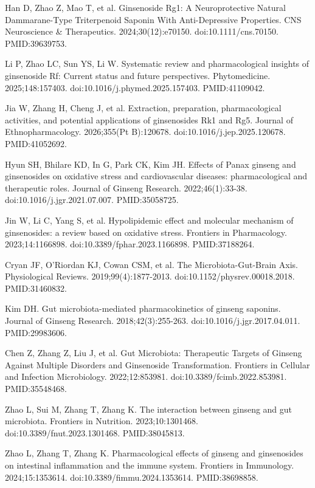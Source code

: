 \documentclass[12pt,oneside]{book}
\newcommand{\reff}[2]{\par\hangindent=7mm\hangafter=1\noindent[#1]\hspace{2mm}#2\par}
\begin{document}
\reff{15}{Han D, Zhao Z, Mao T, et al. Ginsenoside Rg1: A Neuroprotective Natural Dammarane-Type Triterpenoid Saponin With Anti-Depressive Properties. CNS Neuroscience \& Therapeutics. 2024;30(12):e70150. doi:10.1111/cns.70150. PMID:39639753.}

\reff{16}{Li P, Zhao LC, Sun YS, Li W. Systematic review and pharmacological insights of ginsenoside Rf: Current status and future perspectives. Phytomedicine. 2025;148:157403. doi:10.1016/j.phymed.2025.157403. PMID:41109042.}

\reff{17}{Jia W, Zhang H, Cheng J, et al. Extraction, preparation, pharmacological activities, and potential applications of ginsenosides Rk1 and Rg5. Journal of Ethnopharmacology. 2026;355(Pt B):120678. doi:10.1016/j.jep.2025.120678. PMID:41052692.}

\reff{18}{Hyun SH, Bhilare KD, In G, Park CK, Kim JH. Effects of Panax ginseng and ginsenosides on oxidative stress and cardiovascular diseases: pharmacological and therapeutic roles. Journal of Ginseng Research. 2022;46(1):33-38. doi:10.1016/j.jgr.2021.07.007. PMID:35058725.}

\reff{19}{Jin W, Li C, Yang S, et al. Hypolipidemic effect and molecular mechanism of ginsenosides: a review based on oxidative stress. Frontiers in Pharmacology. 2023;14:1166898. doi:10.3389/fphar.2023.1166898. PMID:37188264.}

\reff{20}{Cryan JF, O'Riordan KJ, Cowan CSM, et al. The Microbiota-Gut-Brain Axis. Physiological Reviews. 2019;99(4):1877-2013. doi:10.1152/physrev.00018.2018. PMID:31460832.}

\reff{21}{Kim DH. Gut microbiota-mediated pharmacokinetics of ginseng saponins. Journal of Ginseng Research. 2018;42(3):255-263. doi:10.1016/j.jgr.2017.04.011. PMID:29983606.}

\reff{22}{Chen Z, Zhang Z, Liu J, et al. Gut Microbiota: Therapeutic Targets of Ginseng Against Multiple Disorders and Ginsenoside Transformation. Frontiers in Cellular and Infection Microbiology. 2022;12:853981. doi:10.3389/fcimb.2022.853981. PMID:35548468.}

\reff{23}{Zhao L, Sui M, Zhang T, Zhang K. The interaction between ginseng and gut microbiota. Frontiers in Nutrition. 2023;10:1301468. doi:10.3389/fnut.2023.1301468. PMID:38045813.}

\reff{24}{Zhao L, Zhang T, Zhang K. Pharmacological effects of ginseng and ginsenosides on intestinal inflammation and the immune system. Frontiers in Immunology. 2024;15:1353614. doi:10.3389/fimmu.2024.1353614. PMID:38698858.}
\end{document}
